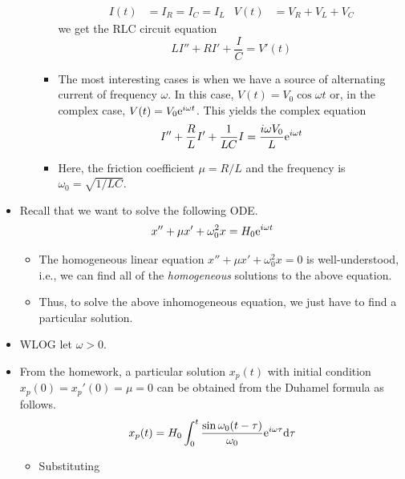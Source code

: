 \documentclass[../notes.tex]{subfiles}
\begin{document}
\begin{itemize}
\begin{enumerate}
\begin{itemize}
            \begin{align*}
                I(t) &= I_R = I_C = I_L&
                V(t) &= V_R+V_L+V_C
            \end{align*}
            we get the RLC circuit equation
            \begin{equation*}
                LI''+RI'+\frac{I}{C} = V'(t)
            \end{equation*}
            \item The most interesting cases is when we have a source of alternating current of frequency $\omega$. In this case, $V(t)=V_0\cos\omega t$ or, in the complex case, $V(t)=V_0\e[i\omega t]$. This yields the complex equation
            \begin{equation*}
                I''+\frac{R}{L}I'+\frac{1}{LC}I = \frac{i\omega V_0}{L}\e[i\omega t]
            \end{equation*}
            \item Here, the friction coefficient $\mu=R/L$ and the frequency is $\omega_0=\sqrt{1/LC}$.
        \end{itemize}
    \end{enumerate}
    \item Recall that we want to solve the following ODE.
    \begin{equation*}
        x''+\mu x'+\omega_0^2x = H_0\e[i\omega t]
    \end{equation*}
    \begin{itemize}
        \item The homogeneous linear equation $x''+\mu x'+\omega_0^2x=0$ is well-understood, i.e., we can find all of the \emph{homogeneous} solutions to the above equation.
        \item Thus, to solve the above inhomogeneous equation, we just have to find a particular solution.
    \end{itemize}
    \item WLOG let $\omega>0$.
    \item From the homework, a particular solution $x_p(t)$ with initial condition $x_p(0)=x_p'(0)=\mu=0$ can be obtained from the Duhamel formula as follows.
    \begin{equation*}
        x_p(t) = H_0\int_0^t\frac{\sin\omega_0(t-\tau)}{\omega_0}\e[i\omega\tau]\dd\tau
    \end{equation*}
    \begin{itemize}
        \item Substituting
        \begin{equation*}

\end{equation*}
\end{itemize}
\end{itemize}
\end{document}
